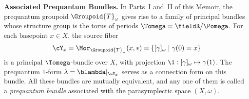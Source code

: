 \begin{article}
  \medskip
  \noindent
  \textbf{Associated Prequantum Bundles.}
  In Parts~I and~II of this Memoir,
  the prequantum groupoid $\Groupoid{T}_\omega$ gives rise to a family of principal bundles
  whose structure group is the torus of periods $\Tomega = \fieldR/\Pomega$.
  For each basepoint $x \in X$,
  the source fiber
  \[
    \cY_x = \Mor_{\Groupoid{T}_\omega}(x,\ast) = \{ [\gamma]_\omega \mid \gamma(0) = x \}
    \]
  is a principal $\Tomega$-bundle over $X$,
  with projection $\1: [\gamma]_\omega \mapsto \gamma(1)$.
  The prequantum $1$-form $\lambda = \blambda|_{\cY_x}$ serves as a connection form
  on this bundle.
  All these bundles are mutually equivalent,
  and any one of them is called a \emph{prequantum bundle}
  associated with the parasymplectic space $(X,\omega)$.
\end{article}

